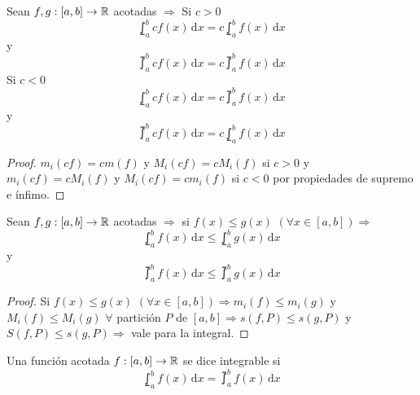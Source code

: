 \begin{prop}
  Sean $f, g: [a, b] \to \mathbb{R}$ acotadas $\Rightarrow$
  Si $c > 0$ \begin{equation}
  \lowint_a^b c f(x)\,\mathrm{d}x = c \lowint_a^b f(x)\,\mathrm{d}x
  \end{equation} y \begin{equation}
    \upint_a^b c f(x)\, \mathrm{d}x = c \upint_a^b f(x)\, \mathrm{d}x
  \end{equation}
  Si $c < 0$ \begin{equation}
    \lowint_a^b c f(x)\,\mathrm{d}x = c \upint_a^b f(x)\,\mathrm{d}x
  \end{equation} y \begin{equation}
    \upint_a^b c f(x)\,\mathrm{d}x = c \lowint_a^b f(x)\,\mathrm{d}x
  \end{equation}
  \begin{proof}
    $m_i(c f) = c m(f)$ y $M_i(c f) = c M_i(f)$ si $c > 0$ y $m_i(c f) = c M_i(f)$ y $M_i(c f) = c m_i(f)$ si $c < 0$ por propiedades de supremo e ínfimo.
  \end{proof}
\end{prop}

\begin{prop}
  Sean $f, g: [a, b] \to \mathbb{R}$ acotadas $\Rightarrow$ si $f(x) \leq g(x)$ $(\forall x \in [a, b]) \Rightarrow$ \begin{equation}
    \lowint_a^b f(x)\,\mathrm{d}x \leq \lowint_a^b g(x)\,\mathrm{d}x
  \end{equation} y \begin{equation}
    \upint_a^b f(x)\, \mathrm{d}x \leq \upint_a^b g(x)\, \mathrm{d}x
  \end{equation}
  \begin{proof}
    Si $f(x) \leq g(x)$ $(\forall x \in [a, b]) \Rightarrow m_i(f) \leq m_i(g)$ y $M_i(f) \leq M_i(g)$ $\forall$ partición $P$ de $[a, b] \Rightarrow s(f, P) \leq s(g, P)$ y $S(f, P) \leq s(g, P) \Rightarrow$ vale para la integral.
  \end{proof}
\end{prop}

\begin{definition}[Integrable]
  Una función acotada $f: [a, b] \to \mathbb{R}$ se dice integrable si \begin{equation}
    \lowint_a^b f(x) \, \mathrm{d}x = \upint_a^b f(x) \, \mathrm{d}x
  \end{equation}
\end{definition}

